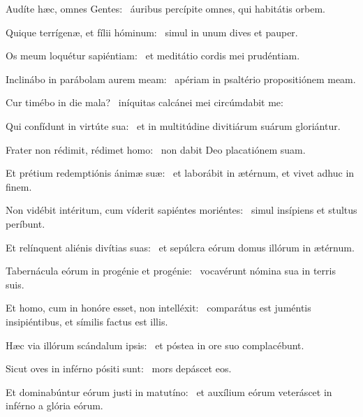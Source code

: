 \item Audíte hæc, omnes Gentes:~\psstar{} áuribus percípite omnes, qui habitátis orbem.

\item Quique terrígenæ, et fílii hóminum:~\psstar{} simul in unum dives et pauper.

\item Os meum loquétur sapiéntiam:~\psstar{} et meditátio cordis mei prudéntiam.

\item Inclinábo in parábolam aurem meam:~\psstar{} apériam in psaltério propositiónem meam.

\item Cur timébo in die mala?~\psstar{} iníquitas calcánei mei circúmdabit me:

\item Qui confídunt in virtúte sua:~\psstar{} et in multitúdine divitiárum suárum gloriántur.

\item Frater non rédimit, rédimet homo:~\psstar{} non dabit Deo placatiónem suam.

\item Et prétium redemptiónis ánimæ suæ:~\psstar{} et laborábit in ætérnum, et vivet adhuc in finem.

\item Non vidébit intéritum, cum víderit sapiéntes moriéntes:~\psstar{} simul insípiens et stultus períbunt.

\item Et relínquent aliénis divítias suas:~\psstar{} et sepúlcra eórum domus illórum in ætérnum.

\item Tabernácula eórum in progénie et progénie:~\psstar{} vocavérunt nómina sua in terris suis.

\item Et homo, cum in honóre esset, non intelléxit:~\psstar{} comparátus est juméntis insipiéntibus, et símilis factus est illis.

\item Hæc via illórum scándalum ipsis:~\psstar{} et póstea in ore suo complacébunt.

\item Sicut oves in inférno pósiti sunt:~\psstar{} mors depáscet eos.

\item Et dominabúntur eórum justi in matutíno:~\psstar{} et auxílium eórum veteráscet in inférno a glória eórum.


